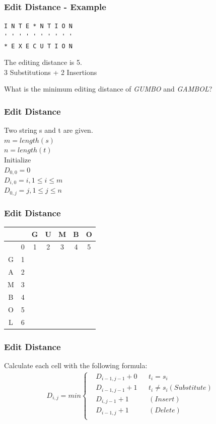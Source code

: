\begin{frame}[fragile]
\frametitle{Edit Distance - Example}
\verb|I N T E * N T I O N|\\
\verb|' ' ' ' ' ' ' ' ' '|\\
\verb|* E X E C U T I O N|\\
 
\vspace{3mm}

The editing distance is 5.\\
3 Substitutions + 2 Insertions\\

\vspace{3mm}

\begin{exercise}
What is the minimum editing distance of \emph{GUMBO} and \emph{GAMBOL}?
\end{exercise}

\end{frame}

\begin{frame}[fragile]
\frametitle{Edit Distance}
Two string s and t are given.\\
$m = length(s)$\\
$n = length(t)$\\
\vspace{3mm}
Initialize\\
$D_{0,0} = 0$\\
$D_{i,0} = i, 1 \leq i \leq m$\\
$D_{0,j} = j, 1 \leq j \leq n$
\end{frame}

\begin{frame}[fragile]
\frametitle{Edit Distance}
\begin{tabular}{|c|c|c|c|c|c|c|}
\hline
 & & G & U & M & B & O\\
\hline
 & 0 & 1 & 2 & 3 & 4 & 5\\
\hline
G & 1 & & & & &\\
\hline
A & 2 & & & & &\\
\hline
M & 3 & & & & &\\
\hline
B & 4 & & & & &\\
\hline
O & 5 & & & & &\\
\hline
L & 6 & & & & &\\
\hline
\end{tabular}
\end{frame}

\begin{frame}[fragile]
\frametitle{Edit Distance}
Calculate each cell with the following formula:
\begin{align}
D_{i,j}= min \left\{
\begin{aligned} & D_{i-1,j-1} + 0 & & t_i = s_i\\
& D_{i-1,j-1} + 1 & & t_i \neq s_i (Substitute)\\
& D_{i,j-1} + 1 & & (Insert)\\
& D_{i-1,j} + 1 & & (Delete)\\
\end{aligned}\right.
\end{align}
\end{frame}

